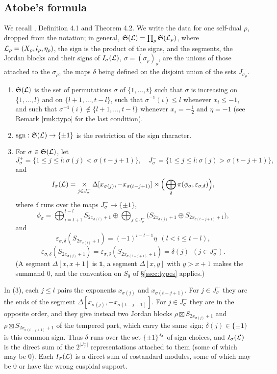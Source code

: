 \documentclass[a4paper,12pt,leqno]{amsart}
\theoremstyle{plain}
\theoremstyle{definition}
\providecommand{\frS}{\mathfrak{S}}\providecommand{\frs}{\mathfrak{s}}
\begin{document}
\subsection{Atobe's formula}
We recall \cite{Ato24}, Definition 4.1 and Theorem 4.2. We write the data for one self-dual $\rho$,
dropped from the notation; in general, $\frS(\caL)=\prod_\rho\frS(\caL_\rho)$, where
$\mathcal{L}_\rho=(X_\rho,l_\rho,\eta_\rho)$, the sign is the product of the signs, and the segments, the Jordan
blocks and their signs of $I_\sigma(\mathcal{L})$, $\sigma=(\sigma_\rho)_\rho$, are the unions of those attached to
the $\sigma_\rho$, the maps $\delta$ being defined on the disjoint union of the sets $J^-_{\sigma_\rho}$.
\begin{enumerate}
\item $\frS(\caL)$ is the set of permutations $\sigma$ of $\{1,\ldots,t\}$ such that $\sigma$ is
increasing on $\{1,\ldots,l\}$ and on $\{l+1,\ldots,t-l\}$, such that $\sigma^{-1}(i)\leq l$ whenever
$x_i\leq-1$, and such that $\sigma^{-1}(i)\notin\{l+1,\ldots,t-l\}$ whenever $x_i=-\tfrac12$ and
$\eta=-1$ (see Remark \ref{rmk:typo} for the last condition).
\item $\mathrm{sgn}:\frS(\caL)\to\{\pm1\}$ is the restriction of the sign character.
\item For $\sigma\in\frS(\caL)$, let 
\[ J^+_\sigma=\{1\leq j\leq l:\sigma(j)<\sigma(t-j+1)\}, \quad  J^-_\sigma=\{1\leq j\leq l:\sigma(j)>\sigma(t-j+1)\},
\]
 and
\[I_\sigma(\mathcal{L})=\mathop{\times}_{j\in J^+_\sigma}\Delta[x_{\sigma(j)},-x_{\sigma(t-j+1)}]\rtimes
\Big(\bigoplus_{\delta}\pi(\phi_\sigma,\varepsilon_{\sigma,\delta})\Big),\]
where $\delta$ runs over the maps $J^-_\sigma\to\{\pm1\}$,
\[\phi_\sigma=\bigoplus_{i=l+1}^{t-l}S_{2x_{\sigma(i)}+1}\oplus\bigoplus_{j\in J^-_\sigma}
\big(S_{2x_{\sigma(j)}+1}\oplus S_{2x_{\sigma(t-j+1)}+1}\big),\]
and
\[\varepsilon_{\sigma,\delta}(S_{2x_{\sigma(i)}+1})=(-1)^{i-l-1}\eta\ \ (l<i\leq t-l),\]
\[\varepsilon_{\sigma,\delta}(S_{2x_{\sigma(j)}+1})=\varepsilon_{\sigma,\delta}(S_{2x_{\sigma(t-j+1)}+1})
=\delta(j)\ \ (j\in J^-_\sigma).\] (A segment $\Delta[x,x+1]$ is $\mathbf{1}$, a segment $\Delta[x,y]$
with $y>x+1$ makes the summand $0$, and the convention on $S_0$ of \S\ref{ssec:types} applies.)
\end{enumerate}
In (3), each $j\leq l$ pairs the exponents $x_{\sigma(j)}$ and $x_{\sigma(t-j+1)}$. For $j\in J^+_\sigma$
they are the ends of the segment $\Delta[x_{\sigma(j)},-x_{\sigma(t-j+1)}]$. For $j\in J^-_\sigma$ they are
in the opposite order, and they give instead two Jordan blocks $\rho\boxtimes S_{2x_{\sigma(j)}+1}$ and
$\rho\boxtimes S_{2x_{\sigma(t-j+1)}+1}$ of the tempered part, which carry the same sign; $\delta(j)\in\{\pm1\}$
is this common sign. Thus $\delta$ runs over the set $\{\pm1\}^{J^-_\sigma}$ of sign choices, and
$I_\sigma(\mathcal{L})$ is the direct sum of the $2^{|J^-_\sigma|}$ representations attached to them (some of
which may be $0$).
Each $I_\sigma(\mathcal{L})$ is a direct sum of costandard modules, some of which may be $0$ or have the wrong
cuspidal support.
\end{document}
